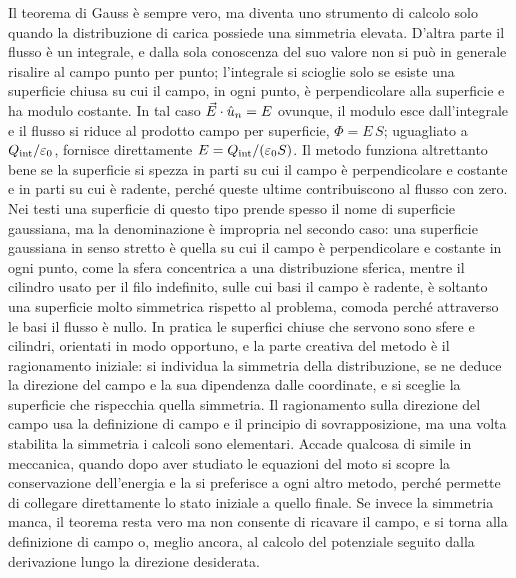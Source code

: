 \documentclass[11pt,a4paper]{article}
\begin{document}
Il teorema di Gauss è sempre vero, ma diventa uno strumento di calcolo solo quando la distribuzione di carica possiede una simmetria elevata. D'altra parte il flusso è un integrale, e dalla sola conoscenza del suo valore non si può in generale risalire al campo punto per punto; l'integrale si scioglie solo se esiste una superficie chiusa su cui il campo, in ogni punto, è perpendicolare alla superficie e ha modulo costante. In tal caso $\vec{E}\cdot\hat{u}_n=E$ ovunque, il modulo esce dall'integrale e il flusso si riduce al prodotto campo per superficie, $\Phi=E\,S$; uguagliato a $Q_{\mathrm{int}}/\varepsilon_0$, fornisce direttamente $E=Q_{\mathrm{int}}/(\varepsilon_0 S)$. Il metodo funziona altrettanto bene se la superficie si spezza in parti su cui il campo è perpendicolare e costante e in parti su cui è radente, perché queste ultime contribuiscono al flusso con zero. Nei testi una superficie di questo tipo prende spesso il nome di superficie gaussiana, ma la denominazione è impropria nel secondo caso: una superficie gaussiana in senso stretto è quella su cui il campo è perpendicolare e costante in ogni punto, come la sfera concentrica a una distribuzione sferica, mentre il cilindro usato per il filo indefinito, sulle cui basi il campo è radente, è soltanto una superficie molto simmetrica rispetto al problema, comoda perché attraverso le basi il flusso è nullo. In pratica le superfici chiuse che servono sono sfere e cilindri, orientati in modo opportuno, e la parte creativa del metodo è il ragionamento iniziale: si individua la simmetria della distribuzione, se ne deduce la direzione del campo e la sua dipendenza dalle coordinate, e si sceglie la superficie che rispecchia quella simmetria. Il ragionamento sulla direzione del campo usa la definizione di campo e il principio di sovrapposizione, ma una volta stabilita la simmetria i calcoli sono elementari. Accade qualcosa di simile in meccanica, quando dopo aver studiato le equazioni del moto si scopre la conservazione dell'energia e la si preferisce a ogni altro metodo, perché permette di collegare direttamente lo stato iniziale a quello finale. Se invece la simmetria manca, il teorema resta vero ma non consente di ricavare il campo, e si torna alla definizione di campo o, meglio ancora, al calcolo del potenziale seguito dalla derivazione lungo la direzione desiderata.
\end{document}
